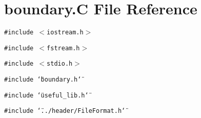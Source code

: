 \hypertarget{boundary_8C}{
\section{boundary.C File Reference}
\label{boundary_8C}
}
{\tt \#include $<$iostream.h$>$}\par
{\tt \#include $<$fstream.h$>$}\par
{\tt \#include $<$stdio.h$>$}\par
{\tt \#include \char`\"{}boundary.h\char`\"{}}\par
{\tt \#include \char`\"{}useful\_\-lib.h\char`\"{}}\par
{\tt \#include \char`\"{}../header/File\-Format.h\char`\"{}}\par
